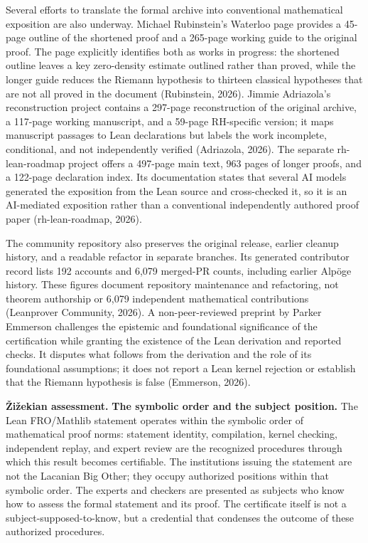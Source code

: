 \documentclass[sn-apa]{sn-jnl}
\begin{document}
Several efforts to translate the formal archive into conventional mathematical exposition are also underway. Michael Rubinstein’s Waterloo page provides a 45-page outline of the shortened proof and a 265-page working guide to the original proof. The page explicitly identifies both as works in progress: the shortened outline leaves a key zero-density estimate outlined rather than proved, while the longer guide reduces the Riemann hypothesis to thirteen classical hypotheses that are not all proved in the document (Rubinstein, 2026). Jimmie Adriazola’s reconstruction project contains a 297-page reconstruction of the original archive, a 117-page working manuscript, and a 59-page RH-specific version; it maps manuscript passages to Lean declarations but labels the work incomplete, conditional, and not independently verified (Adriazola, 2026). The separate rh-lean-roadmap project offers a 497-page main text, 963 pages of longer proofs, and a 122-page declaration index. Its documentation states that several AI models generated the exposition from the Lean source and cross-checked it, so it is an AI-mediated exposition rather than a conventional independently authored proof paper (rh-lean-roadmap, 2026).

The community repository also preserves the original release, earlier cleanup history, and a readable refactor in separate branches. Its generated contributor record lists 192 accounts and 6,079 merged-PR counts, including earlier Alpöge history. These figures document repository maintenance and refactoring, not theorem authorship or 6,079 independent mathematical contributions (Leanprover Community, 2026). A non-peer-reviewed preprint by Parker Emmerson challenges the epistemic and foundational significance of the certification while granting the existence of the Lean derivation and reported checks. It disputes what follows from the derivation and the role of its foundational assumptions; it does not report a Lean kernel rejection or establish that the Riemann hypothesis is false (Emmerson, 2026).

\textbf{Žižekian assessment.} \textbf{The symbolic order and the subject position.} The Lean FRO/Mathlib statement operates within the symbolic order of mathematical proof norms: statement identity, compilation, kernel checking, independent replay, and expert review are the recognized procedures through which this result becomes certifiable. The institutions issuing the statement are not the Lacanian Big Other; they occupy authorized positions within that symbolic order. The experts and checkers are presented as subjects who know how to assess the formal statement and its proof. The certificate itself is not a subject-supposed-to-know, but a credential that condenses the outcome of these authorized procedures.
\end{document}

